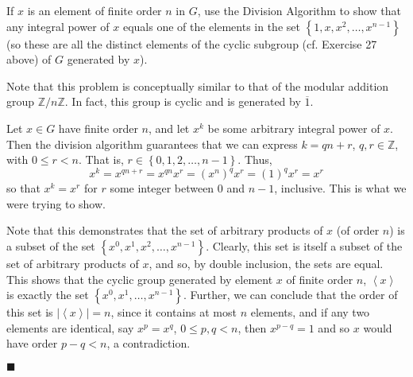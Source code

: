 \documentclass[12pt]{article}
\renewcommand{\qed}{\hfill$\blacksquare$}
\renewenvironment{proof}{\begin{addmargin}[1em]{0em}\begin{newproof}}{\end{newproof}\end{addmargin}\qed}
\newenvironment{problem}[2][Exercise]{\begin{trivlist}
\item[\hskip \labelsep {\bfseries #1}\hskip \labelsep {\bfseries #2.}]}{\end{trivlist}}
\begin{document}
\begin{problem}{1.1.35}
If $x$ is an element of finite order $n$ in $G$, use the Division Algorithm to show that any integral power of $x$ equals one of the elements in the set $\left\{1,x,x^2,\ldots,x^{n-1}\right\}$ (so these are all the distinct elements of the cyclic subgroup (cf. Exercise 27 above) of $G$ generated by $x$).
\end{problem}
Note that this problem is conceptually similar to that of the modular addition group $\mathbb{Z}/n\mathbb{Z}$. In fact, this group is cyclic and is generated by $\overline{1}$.\\
\begin{proof}
Let $x\in G$ have finite order $n$, and let $x^k$ be some arbitrary integral power of $x$. Then the division algorithm guarantees that we can express $k = qn + r$, $q,r\in \mathbb{Z}$, with $0\leq r < n$. That is, $r\in\left\{0,1,2,\ldots,n-1\right\}$. Thus,
$$ x^k = x^{qn+r} = x^{qn}x^r = \left(x^n\right)^q x^r = \left(1\right)^q x^r = x^r $$ so that $x^k = x^r$ for $r$ some integer between $0$ and $n-1$, inclusive. This is what we were trying to show.

Note that this demonstrates that the set of arbitrary products of $x$ (of order $n$) is a subset of the set $\left\{x^0,x^1,x^2,\ldots,x^{n-1}\right\}$. Clearly, this set is itself a subset of the set of arbitrary products of $x$, and so, by double inclusion, the sets are equal. This shows that the cyclic group generated by element $x$ of finite order $n$, $\left\langle x \right\rangle$ is exactly the set $\left\{x^0,x^1,\ldots,x^{n-1}\right\}$. Further, we can conclude that the order of this set is $\left| \left\langle x\right\rangle \right|=n$, since it contains at most $n$ elements, and if any two elements are identical, say $x^p=x^q$, $0\leq p,q < n$, then $x^{p-q} = 1$ and so $x$ would have order $p-q < n$, a contradiction.

\end{proof}
\end{document}
